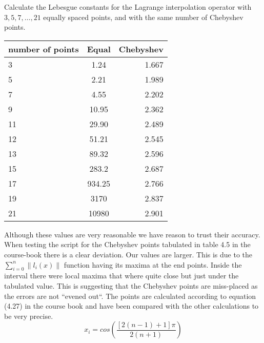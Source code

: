 \begin{problem}
Calculate the Lebesgue constants for the Lagrange interpolation
operator with $3, 5, 7, \dots , 21$ equally spaced points, and with the
same number of Chebyshev points.
\end{problem}


\begin{solution}
 \begin{table}
  \begin{center}
   \begin{tabular}{ l | c | r }
     number of points & Equal & Chebyshev \\ \hline
     3 & 1.24 & 1.667 \\
     5 & 2.21 & 1.989 \\
     7 & 4.55 & 2.202 \\
     9 & 10.95 & 2.362 \\
     11 & 29.90 & 2.489 \\
     12 & 51.21 & 2.545 \\
     13 & 89.32 & 2.596 \\
     15 & 283.2 & 2.687 \\
     17 & 934.25 & 2.766 \\
     19 & 3170 & 2.837 \\
     21 & 10980 & 2.901 \\
   \end{tabular}
 \end{center}
\end{table}

Although these values are very reasonable we have reason to trust
their accuracy. When testing the script for the Chebyshev points tabulated in
table 4.5 in the course-book there is a clear deviation. Our values are larger. This is
due to the $\sum_{i=0}^n \|l_i(x)\|$ function having its maxima at the
end points. Inside the interval there were local maxima that where
quite close but just under the tabulated value. This is suggesting
that the Chebyshev points are miss-placed as the errors are not
 ``evened out``. The points are calculated according to equation
(4.27) in the course book and have been compared with the other
calculations to be very precise. 
\begin{equation*}
  x_i = cos\left(\frac{[2(n - 1) +1]\pi}{2(n + 1)}\right)
\end{equation*}
\end{solution}

